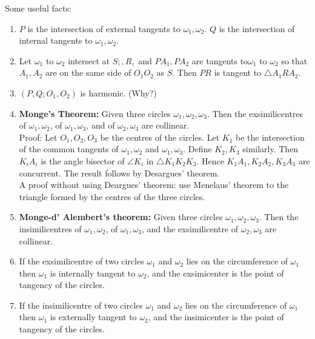 \documentclass[11pt,a4paper]{article}
\begin{document}
 Some useful facts:
\begin {enumerate}
\item $P$ is the intersection of external tangents to $\omega_1, \omega_2$. $Q$ is the intersection of internal tangents to $\omega_1, \omega_2$.
\item Let $\omega_1$ to $\omega_2$ intersect at $S;,R,$ and $PA_1, PA_2$ are tangents to$\omega_1$ to $\omega_2$ so that $A_1,A_2$ are on the same side of $O_1O_2$ as $S$. Then $PR$ is tangent to $\triangle A_1RA_2.$
\item $(P, Q; O_1, O_2)$ is harmonic. (Why?)
\item \textbf {Monge's Theorem:} Given three circles $\omega_1, \omega_2, \omega_3$. Then the exsimilicentres of $\omega_1, \omega_2$, of $\omega_1, \omega_3$, and of $\omega_2, \omega_3$ are collinear.\\
Proof: Let $O_1,O_2,O_3$ be the centres of the circles. Let $K_1$ be the intersection of the common tangents of $\omega_1, \omega_2$ and $\omega_1, \omega_3$. Define $K_2,K_3$ similarly. Then $K_iA_i$ is the angle bisector of $\angle K_i$ in $\triangle K_1K_2K_3$. Hence $K_1A_1,K_2A_2,K_3A_3$ are concurrent. The result follows by Desargues' theorem.\\
A proof without using Deargues' theorem: use Menelaus' theorem to the triangle formed by the centres of the three circles.
\item\textbf {Monge-d' Alembert's theorem:} Given three circles $\omega_1, \omega_2, \omega_3$. Then the insimilicentres of $\omega_1, \omega_2$, of $\omega_1, \omega_3$, and the exsimilicentre of $\omega_2, \omega_3$ are collinear.
\item If the exsimilicentre of two circles $\omega_1$ and $\omega_2$ lies on the circumference of $\omega_1$ then $\omega_1$ is internally tangent to $\omega_2$, and the exsimicenter is the point of tangency of the circles.
\item If the insimilicentre of two circles $\omega_1$ and $\omega_2$ lies on the circumference of $\omega_1$ then $\omega_1$ is externally tangent to $\omega_2$, and the insimicenter is the point of tangency of the circles.

\end {enumerate}
\end{document}
